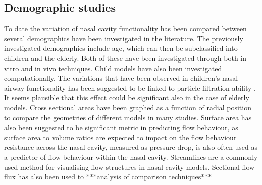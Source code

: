 \documentclass{article}
\begin{document}
\subsection{Demographic studies}
To date the variation of nasal cavity functionality has been compared between several demographics have been investigated in the literature. The previously investigated demographics include  age\cite{Xi2012}, which can then be subclassified into children\cite{Xi2012} and the elderly\cite{Lindemann2008}. Both of these have been investigated through both in vitro\cite{Weinhold2004} and in vivo\cite{Kalmovich2005, Edelstein1996, WhanKim2007, Lindemann2008} techniques. Child models have also been investigated computationally\cite{Xi2012}. The variations that have been observed in children's nasal airway functionality has been suggested to be linked to particle filtration ability \cite{Xi2012}. It seems plausible that this effect could be significant also in the case of elderly models. Cross sectional areas have been graphed as a function of radial position to compare the geometries of different models in many studies\cite{Xi2012, Zhu2011, Lindemann2008, Garcia2007}. Surface area has also been suggested to be significant metric in predicting flow behaviour, as surface area to volume ratios are expected to impact on the flow behaviour\cite{Xi2012, Garcia2007} resistance across the nasal cavity, measured as pressure drop, is also often used as a predictor of flow behaviour within the nasal cavity\cite{Edelstein1996, Lindemann2008, WhanKim2007}. Streamlines are a commonly used method for visualising flow structures in nasal cavity models\cite{Xi2012, Garcia2007, Zhu2011}. Sectional flow flux has also been used to 
***analysis of comparison techniques***





\end{document}
